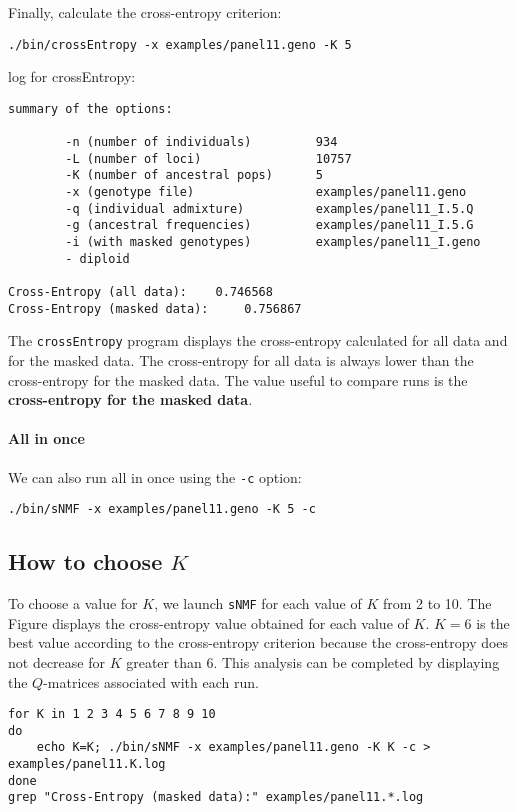 \documentclass[10pt,a4paper]{article}
\begin{document}
Finally, calculate the cross-entropy criterion:
\begin{Verbatim}[frame=single]
./bin/crossEntropy -x examples/panel11.geno -K 5
\end{Verbatim}
\noindent
log for crossEntropy:
\begin{Verbatim}[frame=single]
summary of the options:

        -n (number of individuals)         934
        -L (number of loci)                10757
        -K (number of ancestral pops)      5
        -x (genotype file)                 examples/panel11.geno
        -q (individual admixture)          examples/panel11_I.5.Q
        -g (ancestral frequencies)         examples/panel11_I.5.G
        -i (with masked genotypes)         examples/panel11_I.geno
        - diploid

Cross-Entropy (all data):	 0.746568
Cross-Entropy (masked data):	 0.756867
\end{Verbatim}
\noindent
The {\tt crossEntropy} program displays the cross-entropy calculated for all data and for the masked data.
The cross-entropy for all data is always lower than the cross-entropy for the masked data. 
The value useful to compare runs is the {\bf cross-entropy for the masked data}.


\paragraph{All in once}
We can also run all in once using the \verb|-c| option:
\begin{Verbatim}[frame=single]
./bin/sNMF -x examples/panel11.geno -K 5 -c
\end{Verbatim}

\subsection{How to choose $K$}

To choose a value for $K$, we launch {\tt sNMF} for each value of $K$ from 2 to 10. The Figure displays the cross-entropy value obtained for each value of $K$. $K=6$ is the best value according to the cross-entropy criterion because the cross-entropy does not decrease for $K$ greater than 6. This analysis can be completed by displaying the $Q$-matrices associated with each run. 
\begin{Verbatim}[frame=single]
for K in 1 2 3 4 5 6 7 8 9 10 
do 
	echo K=K; ./bin/sNMF -x examples/panel11.geno -K K -c > examples/panel11.K.log
done
grep "Cross-Entropy (masked data):" examples/panel11.*.log
\end{Verbatim}
\end{document}
